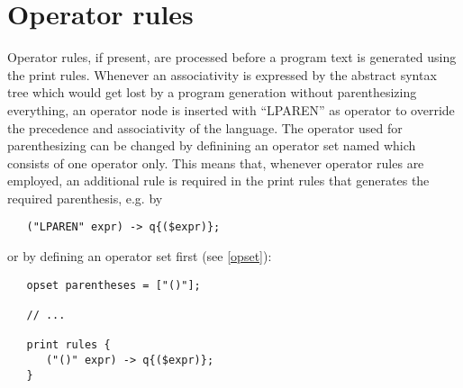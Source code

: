 \chapter{Operator rules}\label{oprules}

Operator rules, if present, are processed before a program text is
generated using the print rules. Whenever an associativity is expressed
by the abstract syntax tree which would get lost by a program generation
without parenthesizing everything, an operator node is inserted with
``LPAREN'' as operator to override the precedence and associativity of
the language. The operator used for parenthesizing can be changed by
definining an operator set named  which consists of
one operator only. This means that, whenever operator rules are employed,
an additional rule is required in the print rules that generates the
required parenthesis, e.g. by

\begin{lstlisting}
   ("LPAREN" expr) -> q{($expr)};
\end{lstlisting}%

\noindent
or by defining an operator set first (see \ref{opset}):

\begin{lstlisting}
   opset parentheses = ["()"];

   // ...

   print rules {
      ("()" expr) -> q{($expr)};
   }
\end{lstlisting}%

\begin{grammar}
      \produces {} \lextoken{\{}
	  \lextoken{\}} \\
      \produces {} \lextoken{;} \\
      \produces {}
	  \lextoken{;} \\
      \produces {}  \\
      \produces {}  \\
      \produces {}  \\
      \produces {} \\
      \produces {}  \\
      \produces {} \\
      \produces {} \\
\end{grammar}

